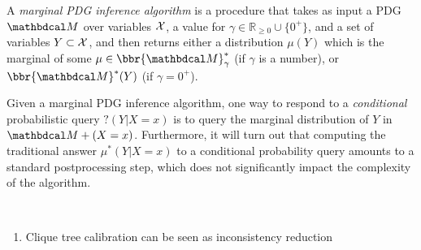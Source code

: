 \documentclass[twoside]{article}
\begin{document}
\begin{defn}
    A \emph{marginal PDG inference algorithm} is a procedure
    that takes as input
    a PDG $\dg M$ over variables $\mathcal X$,
    a value for $\gamma \in \mathbb R_{\ge 0} \cup \{0^+\}$,
    and
    a set of variables $Y \subset \mathcal X$,
    and then returns either a distribution $\mu(Y)$
    which is the
    marginal
    of some $\mu \in \bbr{\dg M}^*_\gamma$  (if $\gamma$ is a number),
    or $\bbr{\dg M}^*(Y)$ (if $\gamma = 0^+$).
\end{defn}

Given a marginal PDG inference algorithm,
one way to respond to a \emph{conditional} probabilistic query
$?(Y|X{=}x)$
is to
query the marginal distribution of $Y$ in $\dg M + (X={x})$.
%
Furthermore,
it will turn out that computing the traditional answer $\mu^*(Y|X{=}x)$
to a conditional probability query amounts to a standard postprocessing step,
which does not significantly impact the complexity of the algorithm.



\TODO[TODO:]

{\color{red}\tt
\begin{enumerate}[nosep]
    \item Clique tree calibration can be seen as inconsistency reduction
\end{enumerate}}
\end{document}
